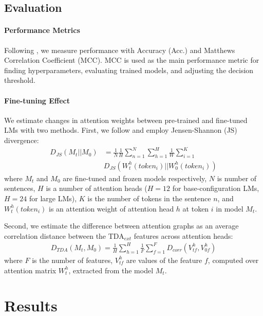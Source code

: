 \documentclass[11pt]{article}
\begin{document}
\subsection{Evaluation}
\label{sec:method_evaluation}
\paragraph{Performance Metrics}
Following \citealp{warstadt-etal-2019-neural}, we measure performance with Accuracy (Acc.) and Matthews Correlation Coefficient (MCC).
MCC is used as the main performance metric for finding hyperparameters, evaluating trained models, and adjusting the decision threshold.
\paragraph{Fine-tuning Effect} 

We estimate changes in attention weights between pre-trained and fine-tuned LMs with two methods. 
First, we follow \citealp{hao-etal-2020-investigating} and employ Jensen-Shannon (JS) divergence:
\begin{equation*}
\begin{aligned}
D_{JS}(M_t||M_0)&=  \frac{1}{N}\frac{1}{H}\sum_{n=1}^{N}\sum_{h=1}^{H}\frac{1}{W}\sum_{i=1}^{K}\\
& D_{JS}(W_t^h(token_i)||W_0^h(token_i))
\end{aligned}
\end{equation*}
where $M_t$ and $M_0$ are fine-tuned and frozen models respectively, $N$ is number of sentences,
$H$ is a number of attention heads ($H=12$ for base-configuration LMs,  $H=24$ for large LMs),
$K$ is the number of tokens in the sentence $n$, and $W_t^h(token_i)$ is an attention weight of attention head $h$ at token $i$ in model $M_t$.

Second, we estimate the difference between attention graphs as an average correlation distance between the TDA$_{ext}$ features across attention heads:
\begin{equation*}
\begin{aligned}
D_{TDA}(M_t,M_0)= \frac{1}{H}\sum_{h=1}^{H}\frac{1}{F}\sum_{f=1}^{F}D_{corr}(V_{tf}^h,V_{0f}^h)
\end{aligned}
\end{equation*}
where $F$ is the number of features, $V_{tf}^h$ are values of the  feature $f$, computed over attention matrix $W_t^h$, extracted from the model $M_t$.
\section{Results}
\end{document}
